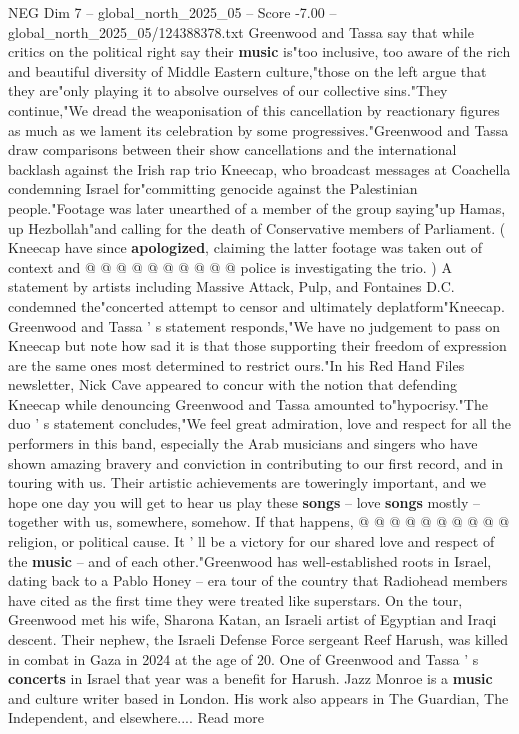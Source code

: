 \begin{textsample}{NEG Dim 7 – global\_north\_2025\_05 – Score -7.00 – global\_north\_2025\_05/124388378.txt}
Greenwood and Tassa say that while critics on the political right say their \textbf{music} is"too inclusive, too aware of the rich and beautiful diversity of Middle Eastern culture,"those on the left argue that they are"only playing it to absolve ourselves of our collective sins."They continue,"We dread the weaponisation of this cancellation by reactionary figures as much as we lament its celebration by some progressives."Greenwood and Tassa draw comparisons between their show cancellations and the international backlash against the Irish rap trio Kneecap, who broadcast messages at Coachella condemning Israel for"committing genocide against the Palestinian people."Footage was later unearthed of a member of the group saying"up Hamas, up Hezbollah"and calling for the death of Conservative members of Parliament. ( Kneecap have since \textbf{apologized}, claiming the latter footage was taken out of context and @ @ @ @ @ @ @ @ @ @ police is investigating the trio. ) A statement by artists including Massive Attack, Pulp, and Fontaines D.C. condemned the"concerted attempt to censor and ultimately deplatform"Kneecap.
Greenwood and Tassa ' s statement responds,"We have no judgement to pass on Kneecap but note how sad it is that those supporting their freedom of expression are the same ones most determined to restrict ours."In his Red Hand Files newsletter, Nick Cave appeared to concur with the notion that defending Kneecap while denouncing Greenwood and Tassa amounted to"hypocrisy."The duo ' s statement concludes,"We feel great admiration, love and respect for all the performers in this band, especially the Arab musicians and singers who have shown amazing bravery and conviction in contributing to our first record, and in touring with us.
Their artistic achievements are toweringly important, and we hope one day you will get to hear us play these \textbf{songs} -- love \textbf{songs} mostly -- together with us, somewhere, somehow.
If that happens, @ @ @ @ @ @ @ @ @ @ religion, or political cause.
It ' ll be a victory for our shared love and respect of the \textbf{music} -- and of each other."Greenwood has well-established roots in Israel, dating back to a Pablo Honey -- era tour of the country that Radiohead members have cited as the first time they were treated like superstars.
On the tour, Greenwood met his wife, Sharona Katan, an Israeli artist of Egyptian and Iraqi descent.
Their nephew, the Israeli Defense Force sergeant Reef Harush, was killed in combat in Gaza in 2024 at the age of 20.
One of Greenwood and Tassa ' s \textbf{concerts} in Israel that year was a benefit for Harush.
Jazz Monroe is a \textbf{music} and culture writer based in London.
His work also appears in The Guardian, The Independent, and elsewhere....
Read more

\end{textsample}
